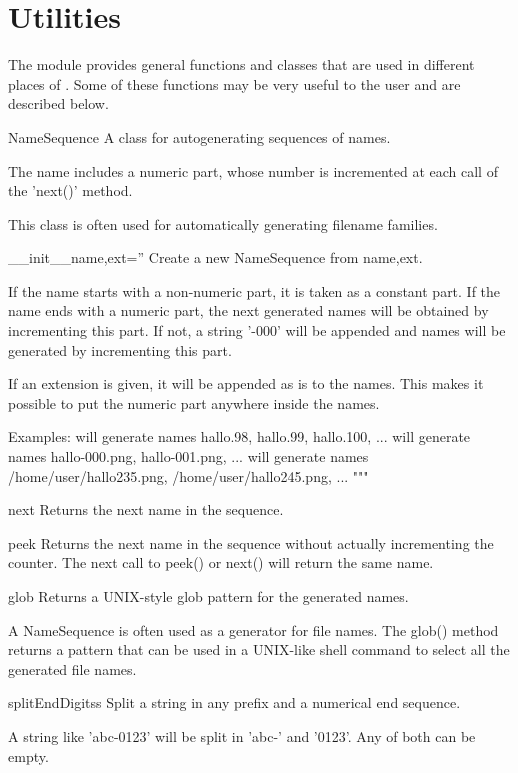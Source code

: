 
\section{Utilities}
\label{sec:utilities}

The  module provides general functions and classes that are used in different places of \pyformex. Some of these functions may be very useful to the user and are described below.

\begin{classdesc}{NameSequence}{}
A class for autogenerating sequences of names.

The name includes a numeric part, whose number is incremented
at each call of the 'next()' method.

This class is often used for automatically generating filename families.
    
\begin{memberdesc}{__init__}{name,ext=''}
Create a new NameSequence from name,ext.

If the name starts with a non-numeric part, it is taken as a constant part.
If the name ends with a numeric part, the next generated names will
be obtained by incrementing this part.
If not, a string '-000' will be appended and names will be generated
by incrementing this part.

If an extension is given, it will be appended as is to the names.
This makes it possible to put the numeric part anywhere inside the
names.

Examples:
 will generate names hallo.98, hallo.99, hallo.100, ...
 will generate names hallo-000.png, hallo-001.png, ...
 will generate names
/home/user/hallo235.png, /home/user/hallo245.png, ...
"""
\end{memberdesc}

\begin{memberdesc}{next}
Returns the next name in the sequence.
\end{memberdesc}

\begin{memberdesc}{peek}
Returns the next name in the sequence without actually incrementing the counter.
The next call to peek() or next() will return the same name.
\end{memberdesc}

\begin{memberdesc}{glob}
Returns a UNIX-style glob pattern for the generated names.

A NameSequence is often used as a generator for file names.
The glob() method returns a pattern that can be used in a
UNIX-like shell command to select all the generated file names.
\end{memberdesc}
\end{classdesc}


\begin{funcdesc}{splitEndDigits}{s}
    Split a string in any prefix and a numerical end sequence.

    A string like 'abc-0123' will be split in 'abc-' and '0123'.
    Any of both can be empty.
\end{funcdesc} 




